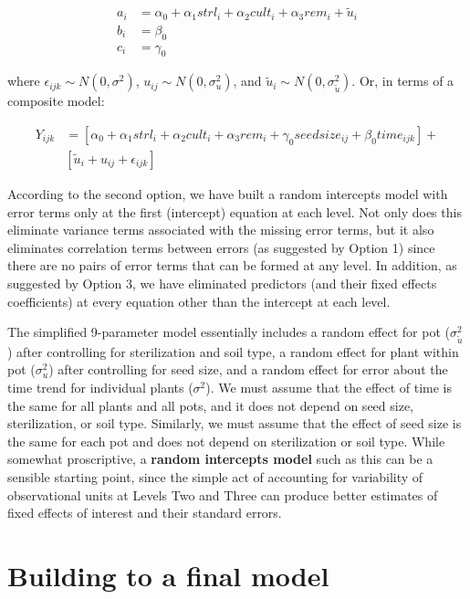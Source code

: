 \documentclass[
]{krantz}
\begin{document}
\begin{align*}
a_{i} & = \alpha_{0} + \alpha_{1}\textstyle{strl}_{i} + \alpha_{2}\textstyle{cult}_{i} + \alpha_{3}\textstyle{rem}_{i} + \tilde{u}_{i} \\
b_{i} & = \beta_{0} \\
c_{i} & = \gamma_{0}
\end{align*}

where \(\epsilon_{ijk}\sim N(0,\sigma^2)\), \(u_{ij}\sim N(0,\sigma_{u}^{2})\), and \(\tilde{u}_{i}\sim N(0,\sigma_{\tilde{u}}^{2})\). Or, in terms of a composite model:

\begin{align*}
Y_{ijk} & = [\alpha_{0}+\alpha_{1}\textstyle{strl}_{i}+\alpha_{2}\textstyle{cult}_{i}+\alpha_{3}\textstyle{rem}_{i} +
 \gamma_{0}\textstyle{seedsize}_{ij} + \beta_{0}\textstyle{time}_{ijk}] + \\
 &  [\tilde{u}_{i}+u_{ij}+\epsilon_{ijk}]
\end{align*}

According to the second option, we have built a random intercepts model with error terms only at the first (intercept) equation at each level. Not only does this eliminate variance terms associated with the missing error terms, but it also eliminates correlation terms between errors (as suggested by Option 1) since there are no pairs of error terms that can be formed at any level. In addition, as suggested by Option 3, we have eliminated predictors (and their fixed effects coefficients) at every equation other than the intercept at each level.

The simplified 9-parameter model essentially includes a random effect for pot (\(\sigma_{\tilde{u}}^{2}\)) after controlling for sterilization and soil type, a random effect for plant within pot (\(\sigma_{u}^{2}\)) after controlling for seed size, and a random effect for error about the time trend for individual plants (\(\sigma^{2}\)). We must assume that the effect of time is the same for all plants and all pots, and it does not depend on seed size, sterilization, or soil type. Similarly, we must assume that the effect of seed size is the same for each pot and does not depend on sterilization or soil type. While somewhat proscriptive, a \textbf{random intercepts model} such as this can be a sensible starting point, since the simple act of accounting for variability of observational units at Levels Two and Three can produce better estimates of fixed effects of interest and their standard errors.

\hypertarget{modelsDEF}{%
\section{Building to a final model}\label{modelsDEF}}
\end{document}
